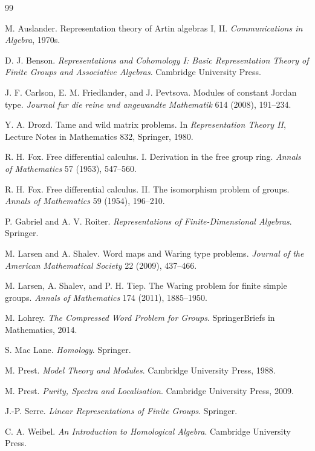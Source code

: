 \documentclass[11pt]{article}
\begin{document}
\begin{thebibliography}{99}

M. Auslander.
Representation theory of Artin algebras I, II.
\emph{Communications in Algebra}, 1970s.

D. J. Benson.
\emph{Representations and Cohomology I: Basic Representation Theory of Finite Groups and Associative Algebras}.
Cambridge University Press.

J. F. Carlson, E. M. Friedlander, and J. Pevtsova.
Modules of constant Jordan type.
\emph{Journal fur die reine und angewandte Mathematik} 614 (2008), 191--234.

Y. A. Drozd.
Tame and wild matrix problems.
In \emph{Representation Theory II}, Lecture Notes in Mathematics 832, Springer, 1980.

R. H. Fox.
Free differential calculus. I. Derivation in the free group ring.
\emph{Annals of Mathematics} 57 (1953), 547--560.

R. H. Fox.
Free differential calculus. II. The isomorphism problem of groups.
\emph{Annals of Mathematics} 59 (1954), 196--210.

P. Gabriel and A. V. Roiter.
\emph{Representations of Finite-Dimensional Algebras}.
Springer.

M. Larsen and A. Shalev.
Word maps and Waring type problems.
\emph{Journal of the American Mathematical Society} 22 (2009), 437--466.

M. Larsen, A. Shalev, and P. H. Tiep.
The Waring problem for finite simple groups.
\emph{Annals of Mathematics} 174 (2011), 1885--1950.

M. Lohrey.
\emph{The Compressed Word Problem for Groups}.
SpringerBriefs in Mathematics, 2014.

S. Mac Lane.
\emph{Homology}.
Springer.

M. Prest.
\emph{Model Theory and Modules}.
Cambridge University Press, 1988.

M. Prest.
\emph{Purity, Spectra and Localisation}.
Cambridge University Press, 2009.

J.-P. Serre.
\emph{Linear Representations of Finite Groups}.
Springer.

C. A. Weibel.
\emph{An Introduction to Homological Algebra}.
Cambridge University Press.

\end{thebibliography}
\end{document}
